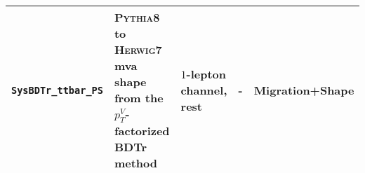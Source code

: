 \begin{table}
{\begin{tabular}{l|llcc}
\texttt{SysBDTr\_ttbar\_PS} & \textsc{Pythia8} to \textsc{Herwig7} mva shape from the $p_T^V$-factorized BDTr method  & $1$-lepton channel, rest & - & Migration+Shape \\
\hline\hline
\end{tabular}
}
\end{table}

